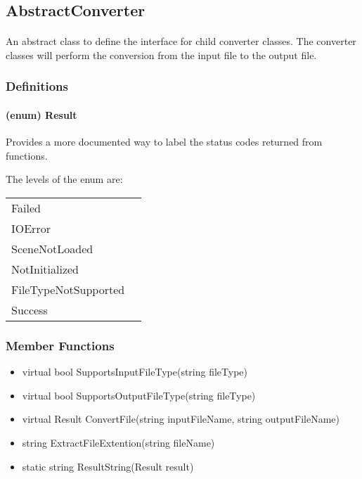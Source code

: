 \hypertarget{fileconversion_abstractconverter}
{
    \label{fileconversion_abstractconverter}
}

\subsection{AbstractConverter}
    \paragraph{}
        An abstract class to define the interface for child converter classes.  The converter classes will perform the conversion from the input file to the output file.

    \subsubsection{Definitions}

    \paragraph{(enum) Result}
    Provides a more documented way to label the status codes returned from functions.

    The levels of the enum are:
    
    \begin{tabular}{l l}
        \centering
        Failed &\\
        IOError &\\
        SceneNotLoaded &\\
        NotInitialized &\\
        FileTypeNotSupported &\\
        Success &
    \end{tabular}
    
    \subsubsection{Member Functions}

        \begin{itemize}
            \item virtual bool SupportsInputFileType(string fileType)
            \item virtual bool SupportsOutputFileType(string fileType)
            \item virtual Result ConvertFile(string inputFileName, string outputFileName)
            \item string ExtractFileExtention(string fileName)
            \item static string ResultString(Result result)
        \end{itemize}

